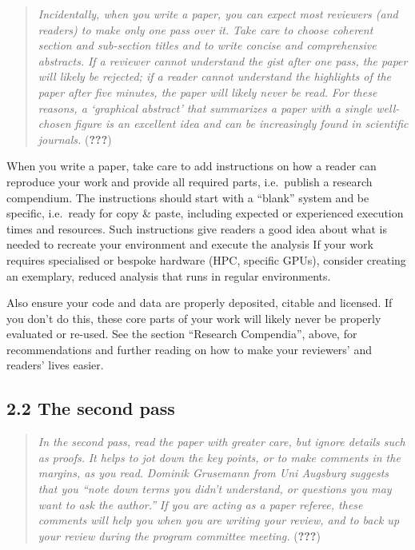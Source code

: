 \documentclass[twocolumn]{article}
\begin{document}
\begin{quote}
\emph{Incidentally, when you write a paper, you can expect most
reviewers (and readers) to make only one pass over it.} \emph{Take care
to choose coherent section and sub-section titles and to write concise
and comprehensive abstracts.} \emph{If a reviewer cannot understand the
gist after one pass, the paper will likely be rejected; if a reader
cannot understand the highlights of the paper after five minutes, the
paper will likely never be read.} \emph{For these reasons, a `graphical
abstract' that summarizes a paper with a single well-chosen figure is an
excellent idea and can be increasingly found in scientific journals.}
({\textbf{???}})
\end{quote}

When you write a paper, take care to add instructions on how a reader
can reproduce your work and provide all required parts, i.e.~publish a
research compendium. The instructions should start with a ``blank''
system and be specific, i.e.~ready for copy \& paste, including expected
or experienced execution times and resources. Such instructions give
readers a good idea about what is needed to recreate your environment
and execute the analysis If your work requires specialised or bespoke
hardware (HPC, specific GPUs), consider creating an exemplary, reduced
analysis that runs in regular environments.

Also ensure your code and data are properly deposited, citable and
licensed. If you don't do this, these core parts of your work will
likely never be properly evaluated or re-used. See the section
``Research Compendia'', above, for recommendations and further reading
on how to make your reviewers' and readers' lives easier.

\hypertarget{the-second-pass}{%
\subsection*{2.2 The second pass}\label{the-second-pass}}

\begin{quote}
\emph{In the second pass, read the paper with greater care, but ignore
details such as proofs.} \emph{It helps to jot down the key points, or
to make comments in the margins, as you read.} \emph{Dominik Grusemann
from Uni Augsburg suggests that you ``note down terms you didn't
understand, or questions you may want to ask the author.''} \emph{If you
are acting as a paper referee, these comments will help you when you are
writing your review, and to back up your review during the program
committee meeting.} ({\textbf{???}})
\end{quote}
\end{document}
